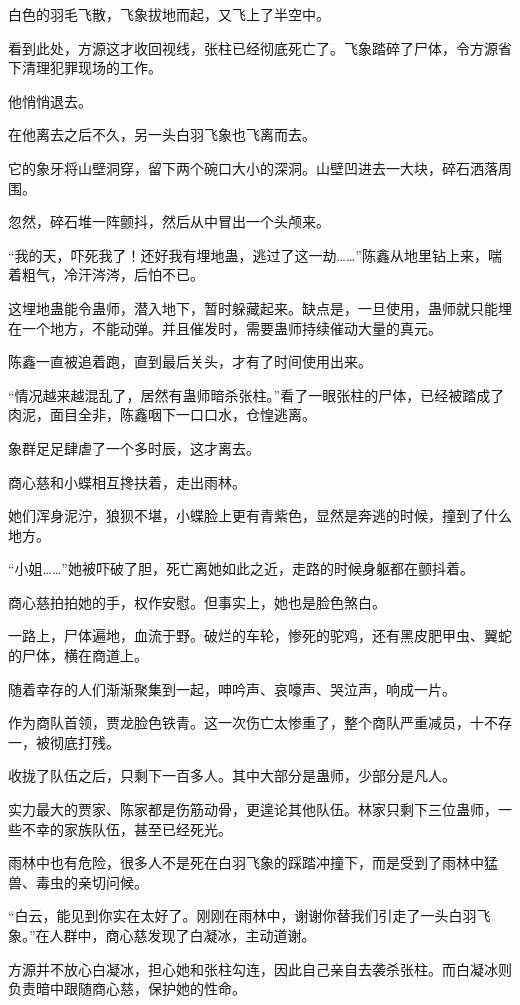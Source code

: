 \begin{this_body}
白色的羽毛飞散，飞象拔地而起，又飞上了半空中。

看到此处，方源这才收回视线，张柱已经彻底死亡了。飞象踏碎了尸体，令方源省下清理犯罪现场的工作。

他悄悄退去。

在他离去之后不久，另一头白羽飞象也飞离而去。

它的象牙将山壁洞穿，留下两个碗口大小的深洞。山壁凹进去一大块，碎石洒落周围。

忽然，碎石堆一阵颤抖，然后从中冒出一个头颅来。

“我的天，吓死我了！还好我有埋地蛊，逃过了这一劫……”陈鑫从地里钻上来，喘着粗气，冷汗涔涔，后怕不已。

这埋地蛊能令蛊师，潜入地下，暂时躲藏起来。缺点是，一旦使用，蛊师就只能埋在一个地方，不能动弹。并且催发时，需要蛊师持续催动大量的真元。

陈鑫一直被追着跑，直到最后关头，才有了时间使用出来。

“情况越来越混乱了，居然有蛊师暗杀张柱。”看了一眼张柱的尸体，已经被踏成了肉泥，面目全非，陈鑫咽下一口口水，仓惶逃离。

象群足足肆虐了一个多时辰，这才离去。

商心慈和小蝶相互搀扶着，走出雨林。

她们浑身泥泞，狼狈不堪，小蝶脸上更有青紫色，显然是奔逃的时候，撞到了什么地方。

“小姐……”她被吓破了胆，死亡离她如此之近，走路的时候身躯都在颤抖着。

商心慈拍拍她的手，权作安慰。但事实上，她也是脸色煞白。

一路上，尸体遍地，血流于野。破烂的车轮，惨死的驼鸡，还有黑皮肥甲虫、翼蛇的尸体，横在商道上。

随着幸存的人们渐渐聚集到一起，呻吟声、哀嚎声、哭泣声，响成一片。

作为商队首领，贾龙脸色铁青。这一次伤亡太惨重了，整个商队严重减员，十不存一，被彻底打残。

收拢了队伍之后，只剩下一百多人。其中大部分是蛊师，少部分是凡人。

实力最大的贾家、陈家都是伤筋动骨，更遑论其他队伍。林家只剩下三位蛊师，一些不幸的家族队伍，甚至已经死光。

雨林中也有危险，很多人不是死在白羽飞象的踩踏冲撞下，而是受到了雨林中猛兽、毒虫的亲切问候。

“白云，能见到你实在太好了。刚刚在雨林中，谢谢你替我们引走了一头白羽飞象。”在人群中，商心慈发现了白凝冰，主动道谢。

方源并不放心白凝冰，担心她和张柱勾连，因此自己亲自去袭杀张柱。而白凝冰则负责暗中跟随商心慈，保护她的性命。


\end{this_body}
